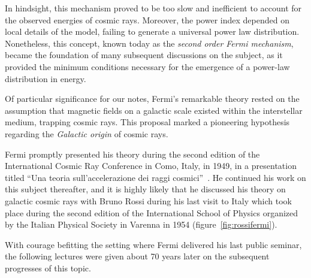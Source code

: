 In hindsight, this mechanism proved to be too slow and inefficient to account for the observed energies of cosmic rays. Moreover, the power index depended on local details of the model, failing to generate a universal power law distribution. Nonetheless, this concept, known today as the \emph{second order Fermi mechanism}, became the foundation of many subsequent discussions on the subject, as it provided the minimum conditions necessary for the emergence of a power-law distribution in energy.

Of particular significance for our notes, Fermi's remarkable theory rested on the assumption that magnetic fields on a galactic scale existed within the interstellar medium, trapping cosmic rays. This proposal marked a pioneering hypothesis regarding the \emph{Galactic origin} of cosmic rays.

Fermi promptly presented his theory during the second edition of the International Cosmic Ray Conference in Como, Italy, in 1949, in a presentation titled ``Una teoria sull'accelerazione dei raggi cosmici''~\cite{Fermi1949icrc}.
%
He continued his work on this subject thereafter, and it is highly likely that he discussed his theory on galactic cosmic rays with Bruno Rossi during his last visit to Italy which took place during the second edition of the International School of Physics organized by the Italian Physical Society in Varenna in 1954 (figure~\ref{fig:rossifermi}).

With courage befitting the setting where Fermi delivered his last public seminar, the following lectures were given about 70 years later on the subsequent progresses of this topic.